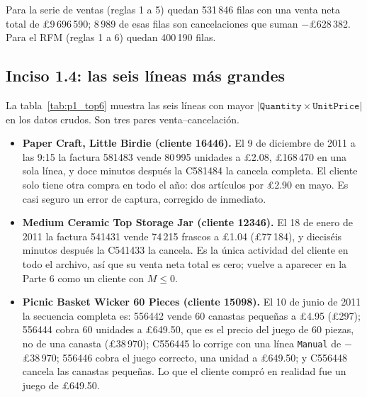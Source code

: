 Para la serie de ventas (reglas 1 a 5) quedan 531\,846 filas con una venta
neta total de \pounds9\,696\,590; 8\,989 de esas filas son cancelaciones que
suman $-$\pounds628\,382. Para el RFM (reglas 1 a 6) quedan 400\,190 filas.

\subsection{Inciso 1.4: las seis líneas más grandes}

La tabla~\ref{tab:p1_top6} muestra las seis líneas con mayor
$|\texttt{Quantity}\times\texttt{UnitPrice}|$ en los datos crudos. Son tres
pares venta--cancelación.

\begin{table}[H]
  \centering
  \footnotesize
  \caption{Las seis líneas con mayor monto absoluto antes de limpiar.
  ``¿Sobrevive?'' indica si la línea sigue en los datos limpios.}
  \label{tab:p1_top6}
\end{table}

\begin{itemize}
  \item \textbf{Paper Craft, Little Birdie (cliente 16446).} El 9 de diciembre
    de 2011 a las 9:15 la factura 581483 vende 80\,995 unidades a \pounds2.08,
    \pounds168\,470 en una sola línea, y doce minutos después la C581484 la
    cancela completa. El cliente solo tiene otra compra en todo el año: dos
    artículos por \pounds2.90 en mayo. Es casi seguro un error de captura,
    corregido de inmediato.
  \item \textbf{Medium Ceramic Top Storage Jar (cliente 12346).} El 18 de
    enero de 2011 la factura 541431 vende 74\,215 frascos a \pounds1.04
    (\pounds77\,184), y dieciséis minutos después la C541433 la cancela. Es
    la única actividad del cliente en todo el archivo, así que su venta neta
    total es cero; vuelve a aparecer en la Parte 6 como un cliente con
    $M\leq 0$.
  \item \textbf{Picnic Basket Wicker 60 Pieces (cliente 15098).} El 10 de
    junio de 2011 la secuencia completa es: 556442 vende 60 canastas
    pequeñas a \pounds4.95 (\pounds297); 556444 cobra 60 unidades a
    \pounds649.50, que es el precio del juego de 60 piezas, no de una canasta
    (\pounds38\,970); C556445 lo corrige con una línea \texttt{Manual} de
    $-$\pounds38\,970; 556446 cobra el juego correcto, una unidad a
    \pounds649.50; y C556448 cancela las canastas pequeñas. Lo que el cliente
    compró en realidad fue un juego de \pounds649.50.
\end{itemize}

